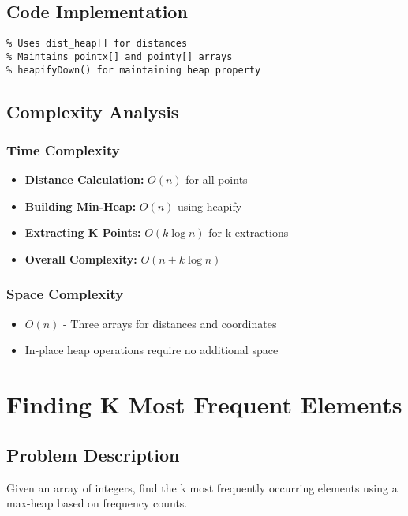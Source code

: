 \documentclass[12pt]{article}
\begin{document}
\subsection{Code Implementation}
\begin{lstlisting}[caption={K Closest Points - closest_points_heap.cpp}]
% CODE TO BE INSERTED HERE
% Uses dist_heap[] for distances
% Maintains pointx[] and pointy[] arrays
% heapifyDown() for maintaining heap property
\end{lstlisting}

\subsection{Complexity Analysis}
\subsubsection{Time Complexity}
\begin{itemize}
    \item \textbf{Distance Calculation:} $O(n)$ for all points
    \item \textbf{Building Min-Heap:} $O(n)$ using heapify
    \item \textbf{Extracting K Points:} $O(k \log n)$ for k extractions
    \item \textbf{Overall Complexity:} $O(n + k \log n)$
\end{itemize}

\subsubsection{Space Complexity}
\begin{itemize}
    \item $O(n)$ - Three arrays for distances and coordinates
    \item In-place heap operations require no additional space
\end{itemize}

\section{Finding K Most Frequent Elements}
\subsection{Problem Description}
Given an array of integers, find the k most frequently occurring elements using a max-heap based on frequency counts.
\end{document}
